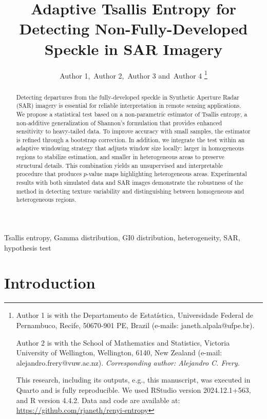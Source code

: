 \documentclass[
  lettersize  journal,
]{IEEEtran}%
\title{Adaptive Tsallis Entropy for Detecting Non-Fully-Developed
Speckle in SAR Imagery}
\author{
Author 1\orcidlink{0000-0002-0265-6236},~Author
2\orcidlink{0000-0000},~Author 3\orcidlink{0000-0003-2673-219X}
and~Author 4\orcidlink{0000-0002-8002-5341}%
\thanks{Author 1 is with the Departamento de Estatística, Universidade
Federal de Pernambuco, Recife, 50670-901 PE, Brazil (e-mails:
janeth.alpala@ufpe.br).

Author 2 is with the School of Mathematics and Statistics, Victoria
University of Wellington, Wellington, 6140, New Zealand (e-mail:
alejandro.frery@vuw.ac.nz).
\emph{Corresponding author: Alejandro C. Frery.}

This research, including its outputs, e.g., this manuscript, was
executed in Quarto and is fully reproducible. We used RStudio version
2024.12.1+563, and R version 4.4.2. Data and code are available at:
\url{https://github.com/rjaneth/renyi-entropy}}
}
\renewcommand*\tablename{Table}
\newcommand\tablename{Table}
\begin{document}


\maketitle

\begin{abstract}
Detecting departures from the fully-developed speckle in Synthetic
Aperture Radar (SAR) imagery is essential for reliable interpretation in
remote sensing applications. We propose a statistical test based on a
non-parametric estimator of Tsallis entropy, a non-additive
generalization of Shannon's formulation that provides enhanced
sensitivity to heavy-tailed data. To improve accuracy with small
samples, the estimator is refined through a bootstrap correction. In
addition, we integrate the test within an adaptive windowing strategy
that adjusts window size locally: larger in homogeneous regions to
stabilize estimation, and smaller in heterogeneous areas to preserve
structural details. This combination yields an unsupervised and
interpretable procedure that produces \(p\)-value maps highlighting
heterogeneous areas. Experimental results with both simulated data and
SAR images demonstrate the robustness of the method in detecting texture
variability and distinguishing between homogeneous and heterogeneous
regions.
\end{abstract}
\begin{IEEEkeywords}
Tsallis entropy, Gamma distribution, GI0
distribution, heterogeneity, SAR, hypothesis test
\end{IEEEkeywords}

%


\renewcommand{\tablename}{TABLE}

\section{Introduction}\label{introduction}
\end{document}
